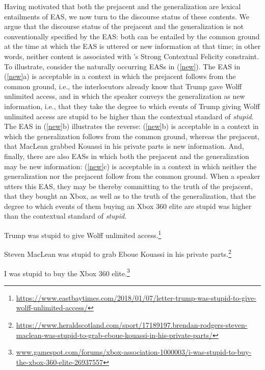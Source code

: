 \documentclass[11pt,fleqn]{article}
\newcommand{\6}{\mbox{$[\hspace*{-.6mm}[$}}
\newcommand{\9}{\mbox{$]\hspace*{-.6mm}]$}}
\newcommand{\citepos}[1]{\citeauthor{#1}'s \citeyear{#1}}
\begin{document}
Having motivated that both the prejacent and the generalization are lexical entailments of EAS, we now turn to the discourse status of these contents. We argue that the discourse status of the prejacent and the generalization is not conventionally specified by the EAS: both can be entailed by the common ground at the time at which the EAS is uttered or new information at that time; in other words, neither content is associated with \citepos{brst-lang11} Strong Contextual Felicity constraint. To illustrate, consider the naturally occurring EASs in (\ref{new}). The EAS in (\ref{new}a) is acceptable in a context in which the prejacent follows from the common ground, i.e., the interlocutors already know that Trump gave Wolff unlimited access, and in which the speaker conveys the generalization as new information, i.e., that they take the degree to which events of Trump giving Wolff unlimited access are stupid to be higher than the contextual standard of {\em stupid}. The EAS in (\ref{new}b) illustrates the reverse: (\ref{new}b) is acceptable in a context in which the generalization follows from the common ground, whereas the prejacent, that MacLean grabbed Kouassi in his private parts is new information. And, finally, there are also EASs in which both the prejacent and the generalization may be new information: (\ref{new}c) is acceptable in a context in which neither the generalization nor the prejacent follow from the common ground. When a speaker utters this EAS, they may be thereby committing to the truth of the prejacent, that they bought an Xbox, as well as to the truth of the generalization, that the degree to which events of them buying an Xbox 360 elite are stupid was higher than the contextual standard of {\em stupid}.

\begin{exe}
\ex\label{new} 

\begin{xlist} 

\ex Trump was stupid to give Wolff unlimited access.\footnote{\url{https://www.eastbaytimes.com/2018/01/07/letter-trump-was-stupid-to-give-wolff-unlimited-access/}}

\ex Steven MacLean was stupid to grab Eboue Kouassi in his private parts.\footnote{\tiny{\url{https://www.heraldscotland.com/sport/17189197.brendan-rodgers-steven-maclean-was-stupid-to-grab-eboue-kouassi-in-his-private-parts/}}}

\ex I was stupid to buy the Xbox 360 elite.\footnote{\url{www.gamespot.com/forums/xbox-association-1000003/i-was-stupid-to-buy-the-xbox-360-elite-26937557}}

\end{xlist}
\end{exe}
\end{document}
